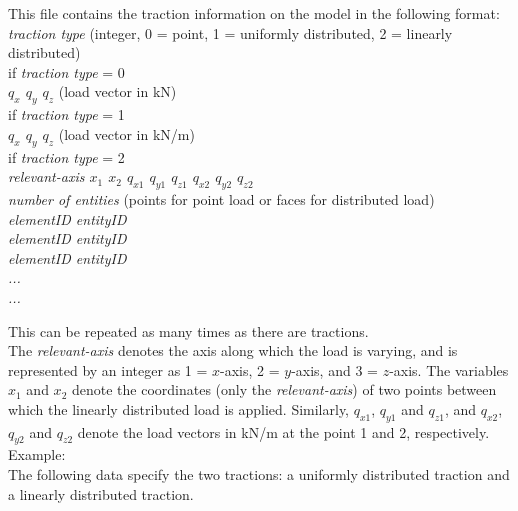 This file contains the traction information on the model in the following format:\\

\emph{traction type} (integer, 0 = point, 1 = uniformly distributed, 2 = linearly distributed)\\
if \emph{traction type} = 0\\
  \emph{$q_x$ $q_y$ $q_z$} (load vector in kN)\\
if \emph{traction type} = 1\\
  \emph{$q_x$ $q_y$ $q_z$} (load vector in kN/m)\\
if \emph{traction type} = 2\\
  \emph{relevant-axis $x_1$ $x_2$ $q_{x1}$ $q_{y1}$ $q_{z1}$ $q_{x2}$ $q_{y2}$ $q_{z2}$}\\
\emph{number of entities} (points for point load or faces for distributed load)\\
\emph{elementID entityID \\
elementID entityID \\
elementID entityID \\
...\\
...\\}

This can be repeated as many times as there are tractions.\\

The \emph{relevant-axis} denotes the axis along which the load is varying, and is represented by an integer as 1 = $x$-axis, 2 = $y$-axis, and 3 = $z$-axis. The variables $x_1$ and $x_2$ denote the coordinates (only the \emph{relevant-axis}) of two points between which the linearly distributed load is applied. Similarly, $q_{x1}$, $q_{y1}$ and $q_{z1}$, and $q_{x2}$, $q_{y2}$ and $q_{z2}$ denote the load vectors in kN/m at the point 1 and 2, respectively.\\

Example:\\
The following data specify the two tractions: a uniformly distributed traction and a linearly distributed traction.\\\\

